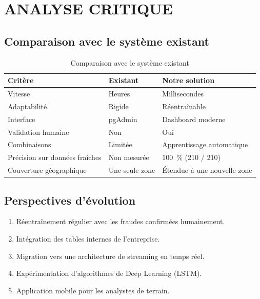 \documentclass[12pt, oneside, a4paper]{report}
\begin{document}
\section{ANALYSE CRITIQUE}

\subsection{Comparaison avec le système existant}
\begin{table}[H]
\centering
\caption{Comparaison avec le système existant}
\label{tab:comparaison-finale}
\vspace{0.3cm}
\renewcommand{\arraystretch}{1.3}
\begin{tabular}{|l|l|l|}
\hline
\textbf{Critère} & \textbf{Existant} & \textbf{Notre solution} \\
\hline
Vitesse & Heures & Millisecondes \\
\hline
Adaptabilité & Rigide & Réentraînable \\
\hline
Interface & pgAdmin & Dashboard moderne \\
\hline
Validation humaine & Non & Oui \\
\hline
Combinaisons & Limitée & Apprentissage automatique \\
\hline
Précision sur données fraîches & Non mesurée & 100~\% (210 / 210) \\
\hline
Couverture géographique & Une seule zone & Étendue à une nouvelle zone \\
\hline
\end{tabular}
\end{table}


\subsection{Perspectives d'évolution}
\begin{enumerate}
\item Réentraînement régulier avec les fraudes confirmées humainement.
\item Intégration des tables internes de l'entreprise.
\item Migration vers une architecture de streaming en temps réel.
\item Expérimentation d'algorithmes de Deep Learning (LSTM).
\item Application mobile pour les analystes de terrain.
\end{enumerate}
\newpage
\end{document}

